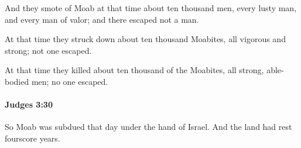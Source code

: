 			\begin{versebox}
					\item[BHS] 
					\item[ASV] And they smote of Moab at that time about ten thousand men, every lusty man, and every man of valor; and there escaped not a man.
					\item[NIV] At that time they struck down about ten thousand Moabites, all vigorous and strong; not one escaped.
					\item[NRSV] At that time they killed about ten thousand of the Moabites, all strong, able-bodied men; no one escaped.
			\end{versebox}

		\paragraph{Judges 3:30} %
			\label{JUDGES-3-30}

			So Moab was subdued that day under the hand of Israel. And the land had rest fourscore years.

